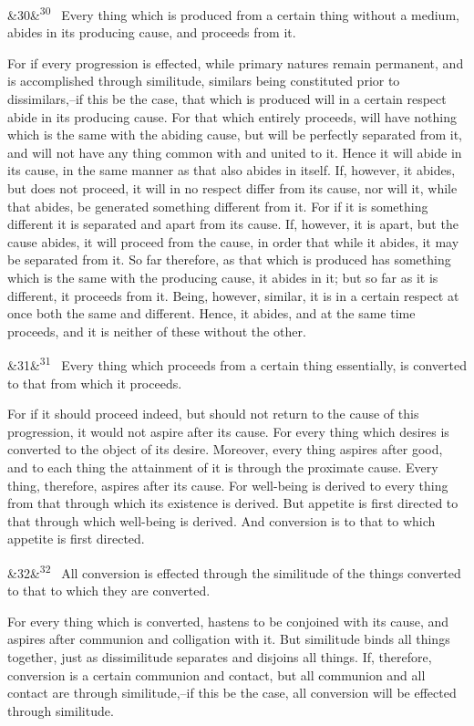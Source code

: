 \documentclass[12pt]{article}
\newcommand{\para}[1][]{\par\noindent\ifx&#1&\else\textsuperscript{\footnotesize #1}~\fi}
\begin{document}
\para[30] Every thing which is produced from a certain thing without a medium, abides in its producing cause, and proceeds from it.

For if every progression is effected, while primary natures remain permanent, and is accomplished through similitude, similars being constituted prior to dissimilars,--if this be the case, that which is produced will in a certain respect abide in its producing cause. For that which entirely proceeds, will have nothing which is the same with the abiding cause, but will be perfectly separated from it, and will not have any thing common with and united to it. Hence it will abide in its cause, in the same manner as that also abides in itself. If, however, it abides, but does not proceed, it will in no respect differ from its cause, nor will it, while that abides, be generated something different from it. For if it is something different it is separated and apart from its cause. If, however, it is apart, but the cause abides, it will proceed from the cause, in order that while it abides, it may be separated from it. So far therefore, as that which is produced has something which is the same with the producing cause, it abides in it; but so far as it is different, it proceeds from it. Being, however, similar, it is in a certain respect at once both the same and different. Hence, it abides, and at the same time proceeds, and it is neither of these without the other.

\para[31] Every thing which proceeds from a certain thing essentially, is converted to that from which it proceeds.

For if it should proceed indeed, but should not return to the cause of this progression, it would not aspire after its cause. For every thing which desires is converted to the object of its desire. Moreover, every thing aspires after good, and to each thing the attainment of it is through the proximate cause. Every thing, therefore, aspires after its cause. For well-being is derived to every thing from that through which its existence is derived. But appetite is first directed to that through which well-being is derived. And conversion is to that to which appetite is first directed.

\para[32] All conversion is effected through the similitude of the things converted to that to which they are converted.

For every thing which is converted, hastens to be conjoined with its cause, and aspires after communion and colligation with it. But similitude binds all things together, just as dissimilitude separates and disjoins all things. If, therefore, conversion is a certain communion and contact, but all communion and all contact are through similitude,--if this be the case, all conversion will be effected through similitude.
\end{document}
